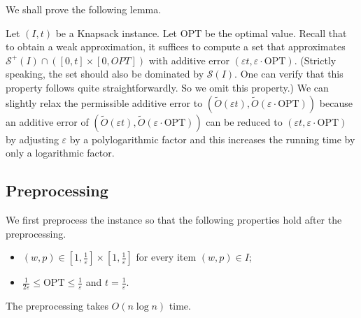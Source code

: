 \documentclass[a4paper,UKenglish,cleveref, autoref, thm-restate, pdfa]{lipics-v2021}
\newcommand{\eps}{\varepsilon}
\renewcommand{\leq}{\leqslant}
\begin{document}
We shall prove the following lemma.
\lemreduce*

Let $(I, t)$ be a Knapsack instance. Let $\mathrm{OPT}$ be the optimal value. Recall that to obtain a weak approximation, it suffices to compute a set that approximates $\mathcal{S}^+(I) \cap ([0, t] \times [0, OPT])$ with additive error $(\eps t, \eps\cdot \mathrm{OPT})$. (Strictly speaking, the set should also be dominated by $\mathcal{S}(I)$. One can verify that this property follows quite straightforwardly. So we omit this property.) We can slightly relax the permissible additive error to $(\tilde{O}(\eps t), \tilde{O}(\eps\cdot \mathrm{OPT}))$ because an additive error of $(\tilde{O}(\eps t), \tilde{O}(\eps\cdot \mathrm{OPT}))$ can be reduced to $(\eps t, \eps\cdot \mathrm{OPT})$ by adjusting $\eps$ by a polylogarithmic factor and this increases the running time by only a logarithmic factor.

\subsection{Preprocessing}
We first preprocess the instance so that the following properties hold after the preprocessing.
\begin{itemize}
    \item $(w, p) \in [1, \frac{1}{\eps}] \times [1, \frac{1}{\eps}]$ for every item $(w, p) \in I$;

    \item $\frac{1}{2\eps} \leq \mathrm{OPT} \leq \frac{1}{\eps}$ and $t = \frac{1}{\eps}$.
\end{itemize}
The preprocessing takes $O(n \log n)$ time.
\end{document}
